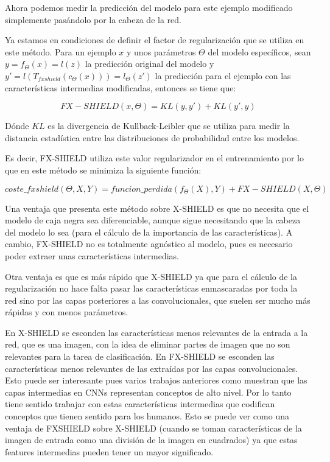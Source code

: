 Ahora podemos medir la predicción del modelo para este ejemplo modificado simplemente pasándolo por la cabeza de la red. 

Ya estamos en condiciones de definir el factor de regularización que se utiliza en este método. Para un ejemplo $x$ y unos parámetros $\Theta$ del modelo específicos, sean $y=f_\Theta(x)=l(z)$ la predicción original del modelo y $y'=l(T_{fxshield}(c_\Theta(x))) = l_\Theta(z')$ la predicción para el ejemplo con las características intermedias modificadas, entonces se tiene que:

\begin{equation}
FX-SHIELD(x,\Theta) = KL(y,y') + KL(y',y)
\end{equation}

Dónde $KL$ es la divergencia de Kullback-Leibler que se utiliza para medir la distancia estadística entre las distribuciones de probabilidad entre los modelos.

Es decir, FX-SHIELD utiliza este valor regularizador en el entrenamiento por lo que en este método se minimiza la siguiente función:

\begin{equation}
coste\_fxshield(\Theta,X,Y) = funcion\_perdida(f_\Theta(X),Y) + FX-SHIELD(X,\Theta)
\end{equation}


Una ventaja que presenta este método sobre X-SHIELD es que no necesita que el modelo de caja negra sea diferenciable, aunque sigue necesitando que la cabeza del modelo lo sea (para el cálculo de la importancia de las características). A cambio, FX-SHIELD no es totalmente agnóstico al modelo, pues es necesario poder extraer unas características intermedias.

Otra ventaja es que es más rápido que X-SHIELD ya que para el cálculo de la regularización no hace falta pasar las características enmascaradas por toda la red sino por las capas posteriores a las convolucionales, que suelen ser mucho más rápidas y con menos parámetros.

En X-SHIELD se esconden las características menos relevantes de la entrada a la red, que es una imagen, con la idea de eliminar partes de imagen que no son relevantes para la tarea de clasificación. En FX-SHIELD se esconden las características menos relevantes de las extraídas por las capas convolucionales. Esto puede ser interesante pues varios trabajos anteriores como \cite{NetDiss,tcav,distill} muestran que las capas intermedias en CNNs representan conceptos de alto nivel. Por lo tanto tiene sentido trabajar con estas características intermedias que codifican conceptos que tienen sentido para los humanos. Esto se puede ver como una ventaja de FXSHIELD sobre X-SHIELD (cuando se toman características de la imagen de entrada como una división de la imagen en cuadrados) ya que estas features intermedias pueden tener un mayor significado.

